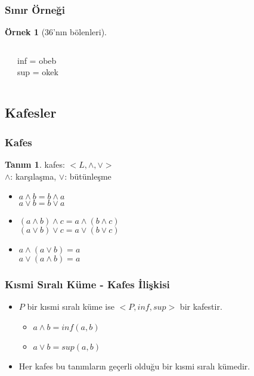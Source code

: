 \documentclass[dvipsnames]{beamer}
\theoremstyle{definition}
\newtheorem{tanim}[theorem]{Tanım}
\theoremstyle{example}
\newtheorem{ornek}[theorem]{Örnek}
\theoremstyle{plain}
\begin{document}
\begin{frame}
  \frametitle{Sınır Örneği}

  \begin{ornek}[36'nın bölenleri]
    \begin{columns}
      \begin{center}
      \end{center}

      inf = obeb\\
      sup = okek
    \end{columns}
  \end{ornek}
\end{frame}

\subsection{Kafesler}

\begin{frame}
  \frametitle{Kafes}

  \begin{tanim}
    \alert{kafes}: $<L,\wedge,\vee>$\\
    $\wedge$: karşılaşma, $\vee$: bütünleşme

    \pause
    \begin{itemize}
      \item $a \wedge b = b \wedge a$\\
        $a \vee b = b \vee a$
      \item$(a \wedge b) \wedge c = a \wedge (b \wedge c)$\\
        $(a \vee b) \vee c = a \vee (b \vee c)$
      \item $a \wedge (a \vee b) = a$\\
        $a \vee (a \wedge b) = a$
    \end{itemize}
  \end{tanim}
\end{frame}

\begin{frame}
  \frametitle{Kısmi Sıralı Küme - Kafes İlişkisi}

  \begin{itemize}
    \item $P$ bir kısmi sıralı küme ise $<P,inf,sup>$ bir kafestir.
    \begin{itemize}
      \item $a \wedge b = inf(a,b)$
      \item $a \vee b = sup(a,b)$
    \end{itemize}

    \pause
    \medskip
    \item Her kafes bu tanımların geçerli olduğu bir kısmi sıralı kümedir.
  \end{itemize}
\end{frame}
\end{document}
